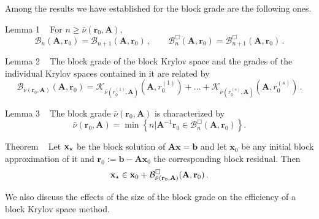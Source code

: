 \documentclass{report}
\newcommand{\calB}{{\mathcal B}}
\newcommand{\calBB}{{\mathcal B}^{\Box}}
\newcommand{\calK}{\mathcal{K}}
\newcommand{\bfA}{{\mathbf A}}
\newcommand{\bfb}{{\mathbf b}}
\newcommand{\bfr}{{\mathbf r}}
\newcommand{\bfx}{{\mathbf x}}
\newcommand{\bfxex}{{\mathbf x}_{\mbox{\scriptsize $\star$}}}
\begin{document}
Among the results we have
established for the block grade are the following ones.


{\sc Lemma 1} ~
For $n \geq \bar\nu(\bfr_0,\bfA)$,
$$
\calB_n(\bfA, \bfr_0) =
\calB_{n+1}(\bfA, \bfr_0)\,,\qquad
\calBB_n(\bfA, \bfr_0) =
\calBB_{n+1}(\bfA, \bfr_0)\,.
$$


{\sc Lemma 2} ~
The block grade of the
block Krylov space and the grades of the individual Krylov
spaces contained in it are related by
$$
\calB_{\bar\nu(\bfr_0,\bfA)}(\bfA, \bfr_0) =
\calK_{\bar\nu(r_0^{(1)},\bfA)}(\bfA, r_0^{(1)})
+ \dots +
\calK_{\bar\nu(r_0^{(s)},\bfA)}(\bfA, r_0^{(s)})\,.
$$

{\sc Lemma 3} ~
The block grade $\bar\nu(\bfr_0,\bfA)$ is characterized by
$$
\bar\nu(\bfr_0,\bfA)
= \min\left\{ n \big\vert \bfA^{-1} \bfr_0 \in
\calBB_n(\bfA, \bfr_0) \right\}.
$$


{\sc Theorem} ~
Let $\bfxex$ be the block
solution of $\bfA\bfx = \bfb$ and let $\bfx_0$ be any
initial block approximation of it and
$\bfr_0 := \bfb - \bfA \bfx_0$
the corresponding block residual. Then
$$
\bfxex \in \bfx_0 +
\calBB_{\bar\nu(\bfr_0,\bfA)}(\bfA,\bfr_0)
\,.
$$

We also discuss the effects of
the size of the block grade on the efficiency of a block
Krylov space method.



\end{document}
